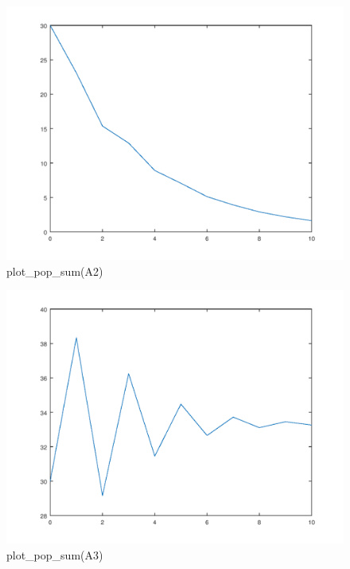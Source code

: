 \documentclass{article}
\begin{document}
\begin{figure}[H]
\centering
\includegraphics[scale=0.5]{plotA2.png}
\caption{plot\_pop\_sum(A2)}
\label{fig:universe}
\end{figure}

\begin{figure}[H]
\centering
\includegraphics[scale=0.5]{plotA3.png}
\caption{plot\_pop\_sum(A3)}
\label{fig:universe}
\end{figure}
\end{document}
